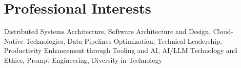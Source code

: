 
\section{Professional Interests}
\footnotesize{Distributed Systems Architecture, Software Architecture and Design, Cloud-Native Technologies, Data Pipelines Optimization, Technical Leadership, Productivity Enhancement through Tooling and AI, AI/LLM Technology and Ethics, Prompt Engineering, Diversity in Technology}